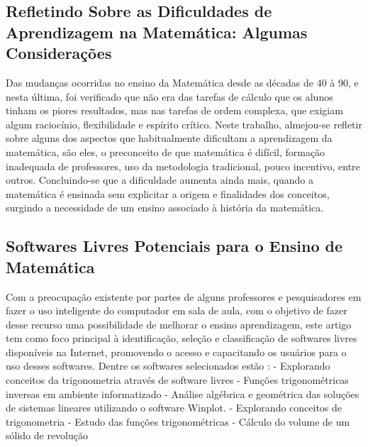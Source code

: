\documentclass[12pt,a4paper]{article}
\begin{document}
\subsection{Refletindo Sobre as Dificuldades de Aprendizagem na Matemática: Algumas Considerações}
Das mudanças ocorridas no ensino da Matemática desde as décadas de 40 à 90, e nesta última, foi verificado que não era das tarefas de cálculo que os alunos tinham os piores resultados, mas nas tarefas de ordem complexa, que exigiam algum raciocínio, flexibilidade e espírito crítico.
Neste trabalho, almejou-se refletir sobre alguns dos aspectos que habitualmente dificultam a aprendizagem da matemática, são eles, o preconceito de que matemática é difícil, formação inadequada de professores, uso da metodologia tradicional, pouco incentivo, entre outros. Concluindo-se que a dificuldade aumenta ainda mais, quando a matemática é ensinada sem explicitar a origem e finalidades dos conceitos, surgindo a necessidade de um ensino associado à história da matemática.\citep{silva2005refletindo}

\subsection{Softwares Livres Potenciais para o Ensino de Matemática}
Com a preocupação existente por partes de alguns professores e pesquisadores em fazer o uso inteligente do computador em sala de aula, com o objetivo de fazer desse recurso uma possibilidade de melhorar o ensino aprendizagem, este artigo tem como foco principal à identificação, seleção e classificação de softwares livres disponíveis na Internet, promovendo o acesso e capacitando os usuários para o uso desses softwares. 
Dentre os softwares selecionados estão :
- Explorando conceitos da trigonometria através de software livres
- Funções trigonométricas inversas em ambiente informatizado
- Análise algébrica e geométrica das soluções de sistemas lineares utilizando o software Winplot.
- Explorando conceitos de trigonometria
- Estudo das funções trigonométricas
- Cálculo do volume de um sólido de revolução\citep{dosciatisoftwares}
\end{document}
